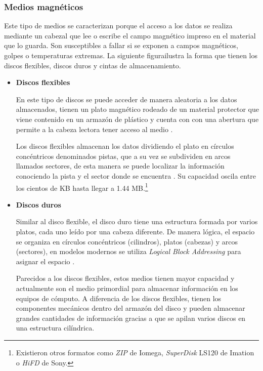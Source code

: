 \newpage
      \subsubsection*{Medios magn\'{e}ticos}

Este tipo de medios se caracterizan porque el acceso a los datos se realiza mediante un cabezal que lee o escribe el campo magn\'{e}tico impreso en el material que lo guarda. Son susceptibles a fallar si se exponen a campos magn\'{e}ticos, golpes o temperaturas extremas. La siguiente figurailustra la forma que tienen los discos flexibles, discos duros y cintas de almacenamiento.

\begin{itemize}
  \item \textbf{Discos flexibles}

En este tipo de discos se puede acceder de manera aleatoria a los datos almacenados, tienen un plato magn\'{e}tico rodeado de un material protector que viene contenido en un armaz\'{o}n de pl\'{a}stico y cuenta con con una abertura que permite a la cabeza lectora tener acceso al medio \cite{_anatomy_????}.

Los discos flexibles almacenan los datos dividiendo el plato en c\'{i}rculos conc\'{e}ntricos denominados pistas, que a su vez se subdividen en arcos llamados sectores, de esta manera se puede localizar la informaci\'{o}n conociendo la pista y el sector donde se encuentra \cite{_illustrated_????}. Su capacidad oscila entre los cientos de \textsc{KB} hasta llegar a 1.44 \textsc{MB}.\footnote{Existieron otros formatos como \textit{ZIP} de Iomega, \textit{SuperDisk} LS120 de Imation o \textit{HiFD} de Sony.}

  \item \textbf{Discos duros}

Similar al disco flexible, el disco duro tiene una estructura formada por varios platos, cada uno le\'{i}do por una cabeza diferente. De manera l\'{o}gica, el espacio se organiza en c\'{i}rculos conc\'{e}ntricos (cilindros), platos (cabezas) y arcos (sectores), en modelos modernos se utiliza \emph{Logical Block Addressing} para asignar el espacio \cite{_introduction_????}.

Parecidos a los discos flexibles, estos medios tienen mayor capacidad y actualmente son el medio primordial para almacenar informaci\'{o}n en los equipos de c\'{o}mputo. A diferencia de los discos flexibles, tienen los componentes mec\'{a}nicos dentro del armaz\'{o}n del disco y pueden almacenar grandes cantidades de informaci\'{o}n gracias a que se apilan varios discos en una estructura cil\'{i}ndrica.


\end{itemize}

